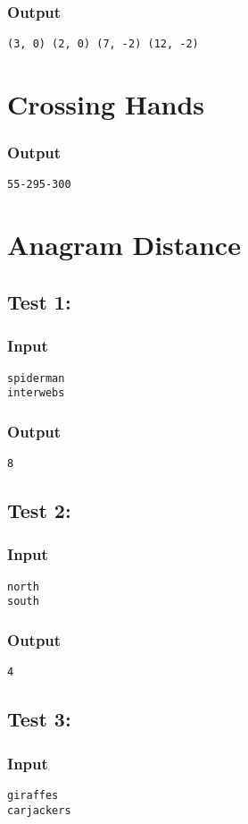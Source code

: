 \documentclass[9pt]{extarticle}
\begin{document}
\begin{multicols}{2}
\subsubsection*{Output}
\texttt{(3, 0) (2, 0) (7, -2) (12, -2)}

\section{Crossing Hands}
\subsubsection*{Output}
\texttt{55-295-300}

\section{Anagram Distance}
\subsection*{Test 1:}
\subsubsection*{Input}
\texttt{spiderman\\
interwebs}

\subsubsection*{Output}
\texttt{8}

\subsection*{Test 2:}
\subsubsection*{Input}
\texttt{north\\
south}

\subsubsection*{Output}
\texttt{4}

\subsection*{Test 3:}
\subsubsection*{Input}
\texttt{giraffes\\
carjackers}


\end{multicols}
\end{document}
